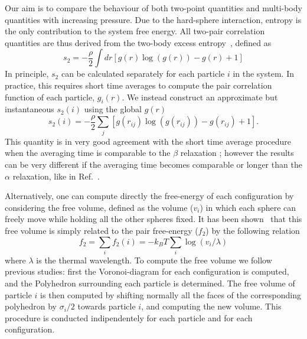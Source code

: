 \documentclass[twocolumn,superscriptaddress]{revtex4-1}
\begin{document}
Our aim is to compare the behaviour of both two-point quantities and multi-body quantities with increasing pressure.
Due to the hard-sphere interaction, entropy is the only contribution to the system free energy.
All two-pair correlation quantities are thus derived from the two-body excess entropy~\cite{Nettleton1958,Mountain1971},
defined as
\begin{equation}
s_2=-\frac{\rho}{2}\int dr\left[g(r)\log(g(r))-g(r)+1\right]
\end{equation}
In principle, $s_2$ can be calculated separately for each particle $i$ in the system. In practice, this requires short time averages to compute the pair correlation function of each particle, $g_i(r)$\cite{tanaka}. We instead construct an approximate but instantaneous $s_2(i)$ using the global $g(r)$
\begin{equation}
s_2(i) = -\frac{\rho}{2}\sum_j \left[g(r_{ij})\log(g(r_{ij}))-g(r_{ij})+1\right].
\end{equation}
This quantity is in very good agreement with the short time average procedure when the averaging time is comparable to the $\beta$ relaxation ; however the results can be very different if the averaging time becomes comparable or longer than the $\alpha$ relaxation, like in Ref.~\cite{tanaka}.

Alternatively, one can compute directly the free-energy of each configuration by
considering the free volume, defined as the volume ($v_i$) in which each sphere can freely
move while holding all the other spheres fixed. It has been shown~\cite{Aste2004} that this free
volume is simply related to the pair free-energy ($f_2$) by the following relation
\begin{equation}
f_2=\sum_i f_2(i)=-k_BT\sum_i \log(v_i/\lambda)
\end{equation}
where $\lambda$ is the thermal wavelength. To compute the free volume we follow previous
studies: first the Voronoi-diagram for each configuration is computed, and the Polyhedron
surrounding each particle is determined. The free volume of particle $i$ is then
computed by shifting normally all the faces of the corresponding polyhedron by $\sigma_i/2$
towards particle $i$, and computing the new volume. This procedure is conducted indipendentely
for each particle and for each configuration.
\end{document}
